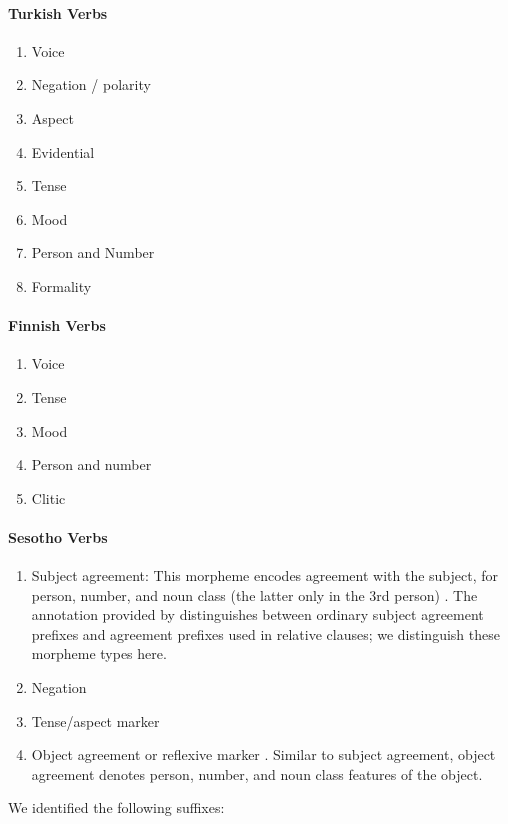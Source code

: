 \documentclass[11pt,letterpaper]{article}
\begin{document}
\paragraph{Turkish Verbs}
\begin{enumerate}
    \item Voice
    \item Negation / polarity
    \item Aspect
    \item Evidential 
    \item Tense 
    \item Mood 
    \item Person and Number
    \item Formality
\end{enumerate}

\paragraph{Finnish Verbs}
\begin{enumerate}
    \item Voice
    \item Tense 
    \item Mood 
    \item Person and number
    \item Clitic
\end{enumerate}

\paragraph{Sesotho Verbs}

\begin{enumerate}
    \item Subject agreement: This morpheme encodes agreement with the subject, for person, number, and noun class (the latter only in the 3rd person) \cite[]{doke1967textbook}.
            The annotation provided by \cite{demuth1992acquisition} distinguishes between ordinary subject agreement prefixes and agreement prefixes used in relative clauses; we distinguish these morpheme types here.

    \item Negation \citep[]{doke1967textbook}

    \item Tense/aspect marker   \citep[--424]{doke1967textbook}

    \item Object agreement or reflexive marker \citep[]{doke1967textbook}.
    Similar to subject agreement, object agreement denotes person, number, and noun class features of the object.
\end{enumerate}
We identified the following suffixes:
\end{document}

